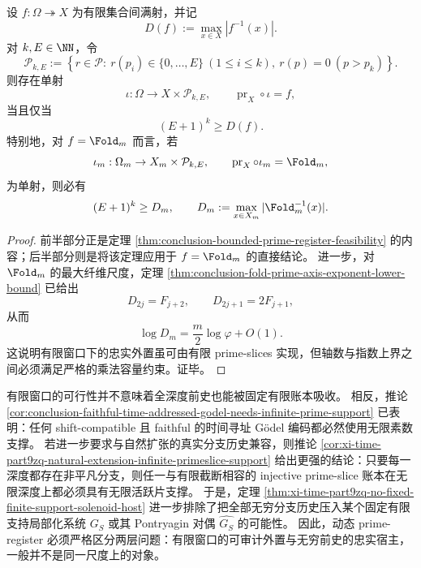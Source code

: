 \begin{proposition}[有限窗口账本的可行域]\label{prop:emergent-arithmetic-dynamic-prime-register-bounded-feasibility}
设 \(f:\Omega\twoheadrightarrow X\) 为有限集合间满射，并记
\[
D(f):=\max_{x\in X}|f^{-1}(x)|.
\]
对 \(k,E\in\NN\)，令
\[
\mathcal P_{k,E}
:=
\left\{
r\in\mathcal P:\ r(p_i)\in\{0,\dots,E\}\ (1\le i\le k),\ r(p)=0\ (p>p_k)
\right\}.
\]
则存在单射
\[
\iota:\Omega\to X\times\mathcal P_{k,E},
\qquad
\operatorname{pr}_X\circ\iota=f,
\]
当且仅当
\[
(E+1)^k\ge D(f).
\]
特别地，对 \(f=\Fold_m\) 而言，若
\[
\iota_m:\Omega_m\to X_m\times\mathcal P_{k,E},
\qquad
\operatorname{pr}_X\circ\iota_m=\Fold_m,
\]
为单射，则必有
\[
(E+1)^k\ge D_m,
\qquad
D_m:=\max_{x\in X_m}|\Fold_m^{-1}(x)|.
\]
\end{proposition}

\begin{proof}
前半部分正是定理 \ref{thm:conclusion-bounded-prime-register-feasibility} 的内容；后半部分则是将该定理应用于 \(f=\Fold_m\) 的直接结论。
进一步，对 \(\Fold_m\) 的最大纤维尺度，定理 \ref{thm:conclusion-fold-prime-axis-exponent-lower-bound} 已给出
\[
D_{2j}=F_{j+2},
\qquad
D_{2j+1}=2F_{j+1},
\]
从而
\[
\log D_m=\frac{m}{2}\log\varphi+O(1).
\]
这说明有限窗口下的忠实外置虽可由有限 prime-slices 实现，但轴数与指数上界之间必须满足严格的乘法容量约束。证毕。
\end{proof}

\begin{remark}\label{rem:emergent-arithmetic-dynamic-prime-register-infinite-support}
有限窗口的可行性并不意味着全深度前史也能被固定有限账本吸收。
相反，推论 \ref{cor:conclusion-faithful-time-addressed-godel-needs-infinite-prime-support} 已表明：任何 shift-compatible 且 faithful 的时间寻址 Gödel 编码都必然使用无限素数支撑。
若进一步要求与自然扩张的真实分支历史兼容，则推论 \ref{cor:xi-time-part9zq-natural-extension-infinite-primeslice-support} 给出更强的结论：只要每一深度都存在非平凡分支，则任一与有限截断相容的 injective prime-slice 账本在无限深度上都必须具有无限活跃片支撑。
于是，定理 \ref{thm:xi-time-part9zq-no-fixed-finite-support-solenoid-host} 进一步排除了把全部无穷分支历史压入某个固定有限支持局部化系统 \(G_S\) 或其 Pontryagin 对偶 \(\widehat{G_S}\) 的可能性。
因此，动态 prime-register 必须严格区分两层问题：有限窗口的可审计外置与无穷前史的忠实宿主，一般并不是同一尺度上的对象。
\end{remark}


